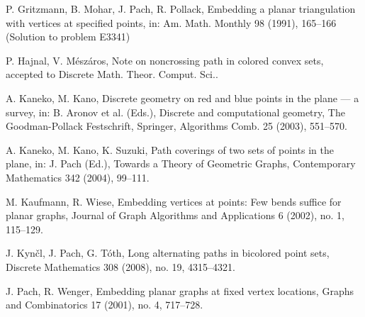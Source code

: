\documentclass[12pt]{article}
\begin{document}
\begin{thebibliography}{ABC}
P. Gritzmann, B. Mohar, J. Pach, R. Pollack,
Embedding a planar triangulation with vertices at specified points,
in: Am. Math. Monthly 98 (1991), 165--166 (Solution to problem E3341)

P. Hajnal, V. M\'esz\'aros, 
Note on noncrossing path in colored convex sets, accepted to Discrete Math. Theor. Comput. Sci..

A. Kaneko, M. Kano,
Discrete geometry on red and blue points in the plane --- a survey,
in: B. Aronov et al. (Eds.), Discrete and computational geometry,
The Goodman-Pollack Festschrift, Springer,
Algorithms Comb. 25 (2003), 551--570.

A. Kaneko, M. Kano, K. Suzuki, Path coverings of two sets of points in the plane,
in: J. Pach (Ed.), Towards a Theory of Geometric Graphs, Contemporary Mathematics 342
(2004), 99--111.

M. Kaufmann, R. Wiese,
Embedding vertices at points: Few bends suffice for planar graphs,
Journal of Graph Algorithms and Applications 6 (2002), no. 1, 115--129.

J. Kyn\v cl, J. Pach, G. T\'oth, Long alternating paths in bicolored point sets, 
Discrete Mathematics 308 (2008), no. 19, 4315--4321.

J. Pach, R. Wenger, 
Embedding planar graphs at fixed vertex locations, 
Graphs and Combinatorics 17 (2001), no. 4, 717--728.


\end{thebibliography}
\end{document}
